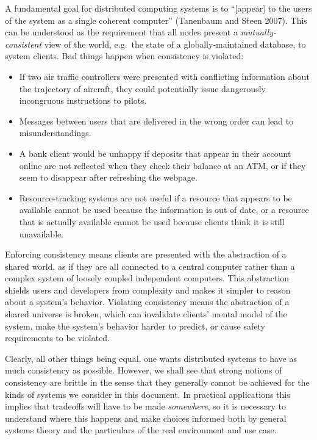 \documentclass[]             %
{NASA}                       %
\theoremstyle{definition}
\begin{document}
A fundamental goal for distributed computing systems is to
``{[}appear{]} to the users of the system as a single coherent
computer'' (Tanenbaum and Steen 2007). This can be understood as the
requirement that all nodes present a \emph{mutually-consistent} view of
the world, e.g.~the state of a globally-maintained database, to system
clients. Bad things happen when consistency is violated:

\begin{itemize}
\item
  If two air traffic controllers were presented with conflicting
  information about the trajectory of aircraft, they could potentially
  issue dangerously incongruous instructions to pilots.
\item
  Messages between users that are delivered in the wrong order can lead
  to misunderstandings.
\item
  A bank client would be unhappy if deposits that appear in their
  account online are not reflected when they check their balance at an
  ATM, or if they seem to disappear after refreshing the webpage.
\item
  Resource-tracking systems are not useful if a resource that appears to
  be available cannot be used because the information is out of date, or
  a resource that is actually available cannot be used because clients
  think it is still unavailable.
\end{itemize}

Enforcing consistency means clients are presented with the abstraction
of a shared world, as if they are all connected to a central computer
rather than a complex system of loosely coupled independent computers.
This abstraction shields users and developers from complexity and makes
it simpler to reason about a system's behavior. Violating consistency
means the abstraction of a shared universe is broken, which can
invalidate clients' mental model of the system, make the system's
behavior harder to predict, or cause safety requirements to be violated.

Clearly, all other things being equal, one wants distributed systems to
have as much consistency as possible. However, we shall see that strong
notions of consistency are brittle in the sense that they generally
cannot be achieved for the kinds of systems we consider in this
document. In practical applications this implies that tradeoffs will
have to be made \emph{somewhere}, so it is necessary to understand where
this happens and make choices informed both by general systems theory
and the particulars of the real environment and use case.
\end{document}
